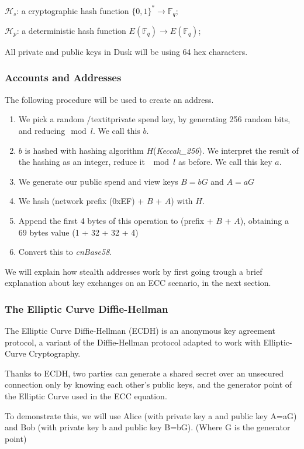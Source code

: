 $\mathcal{H}_s$: a cryptographic hash function $\{0,1\}^*\rightarrow\mathbb{F}_q$;

$\mathcal{H}_p$: a deterministic hash function $E(\mathbb{F}_q)\rightarrow E(\mathbb{F}_q)$;

All private and public keys in \textrm{Dusk} will be using 64 hex characters.

\subsubsection{Accounts and Addresses}

The following procedure will be used to create an address.

\begin{enumerate}
\item  We pick a random /textit{private spend key}, by generating 256 random bits, and reducing$\mod l$. We call this $b$.
\item  $b$ is hashed with hashing algorithm $H$(\textit{Keccak\_256}). We interpret the result of the hashing as an integer, reduce it $\mod l$ as before. We call this key $a$.  
\item  We generate our public spend and view keys $B=bG$ and $A=aG$
\item  We hash (network prefix (0xEF) + $B$ + $A$) with $H$.
\item  Append the first 4 bytes of this operation to (prefix + $B$ + $A$), obtaining a 69 bytes value (1 + 32 + 32 + 4)
\item  Convert this to \textit{cnBase58}.
\end{enumerate}

We will explain how stealth addresses work by first going trough a brief explanation about key exchanges on an ECC scenario, in the next section.

\subsubsection{The Elliptic Curve Diffie-Hellman}

The Elliptic Curve Diffie-Hellman (ECDH) is an anonymous key agreement protocol, a variant of the Diffie-Hellman protocol adapted to work with Elliptic-Curve Cryptography.

Thanks to ECDH, two parties can generate a shared secret over an unsecured connection only by knowing each other's public keys, and the generator point of the Elliptic Curve used in the ECC equation.

To demonstrate this, we will use Alice (with private key a and public key A=aG) and Bob (with private key b and public key B=bG). (Where G is the generator point)

